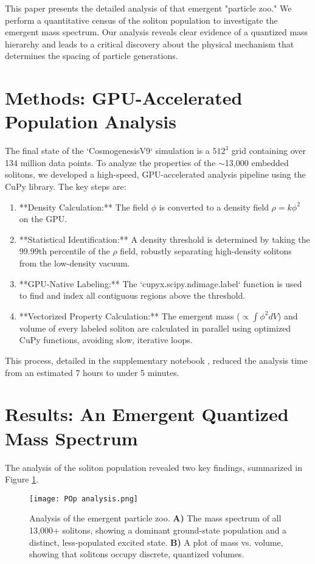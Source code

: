 \documentclass[11pt, twoside]{article}
\begin{document}
This paper presents the detailed analysis of that emergent "particle zoo." We perform a quantitative census of the soliton population to investigate the emergent mass spectrum. Our analysis reveals clear evidence of a quantized mass hierarchy and leads to a critical discovery about the physical mechanism that determines the spacing of particle generations.

\section{Methods: GPU-Accelerated Population Analysis}
The final state of the `CosmogenesisV9` simulation is a \(512^3\) grid containing over 134 million data points. To analyze the properties of the \(\sim\)13,000 embedded solitons, we developed a high-speed, GPU-accelerated analysis pipeline using the CuPy library. The key steps are:
\begin{enumerate}
    \item **Density Calculation:** The field \(\phi\) is converted to a density field \(\rho = k\phi^2\) on the GPU.
    \item **Statistical Identification:** A density threshold is determined by taking the 99.99th percentile of the \(\rho\) field, robustly separating high-density solitons from the low-density vacuum.
    \item **GPU-Native Labeling:** The `cupyx.scipy.ndimage.label` function is used to find and index all contiguous regions above the threshold.
    \item **Vectorized Property Calculation:** The emergent mass (\(\propto \int \phi^2 dV\)) and volume of every labeled soliton are calculated in parallel using optimized CuPy functions, avoiding slow, iterative loops.
\end{enumerate}
This process, detailed in the supplementary notebook \citep{FULLNUF}, reduced the analysis time from an estimated 7 hours to under 5 minutes.

\section{Results: An Emergent Quantized Mass Spectrum}
The analysis of the soliton population revealed two key findings, summarized in Figure \ref{fig:zoo}.

\begin{figure}[htbp!]
\centering
\texttt{[image: POp analysis.png]}
\caption{Analysis of the emergent particle zoo. \textbf{A)} The mass spectrum of all 13,000+ solitons, showing a dominant ground-state population and a distinct, less-populated excited state. \textbf{B)} A plot of mass vs. volume, showing that solitons occupy discrete, quantized volumes.}
\label{fig:zoo}
\end{figure}
\end{document}
